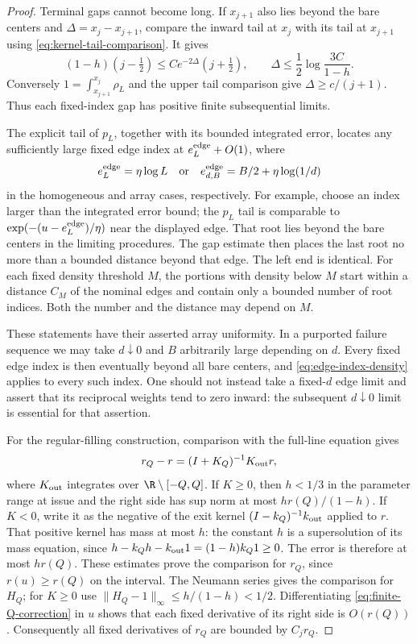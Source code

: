 \begin{proof}
Terminal gaps cannot become long.  If $x_{j+1}$ also lies beyond
the bare centers and $\Delta=x_j-x_{j+1}$, compare the inward
tail at $x_j$ with its tail at $x_{j+1}$ using
\eqref{eq:kernel-tail-comparison}.  It gives
\[
 (1-h)(j-\tfrac12)
 \le C e^{-2\Delta}(j+\tfrac12),
 \qquad
 \Delta\le\frac12\log\frac{3C}{1-h}.
\]
Conversely $1=\int_{x_{j+1}}^{x_j}\rho_L$ and the upper tail
comparison give $\Delta\ge c/(j+1)$.
Thus each fixed-index gap has positive finite subsequential limits.

The explicit tail of $p_L$, together with its bounded integrated
error, locates any sufficiently large fixed edge index at
$e_L^{\rm edge}+O(1)$, where
\begin{equation}\label{eq:nominal-edges}
 e_L^{\rm edge}=\eta\log L
 \quad\hbox{or}\quad
 e_{d,B}^{\rm edge}=B/2+\eta\log(1/d)
\end{equation}
in the homogeneous and array cases, respectively.  For example,
choose an index larger than the integrated error bound; the
$p_L$ tail is comparable to
$\exp(-(u-e_L^{\rm edge})/\eta)$ near the displayed edge.
That root lies beyond the bare centers in the limiting procedures.
The gap estimate then places the last root no more than a bounded
distance beyond that edge.  The left end is identical.
For each fixed density threshold $M$, the portions with density
below $M$ start within a distance $C_M$ of the nominal edges and
contain only a bounded number of root indices.  Both the number and
the distance may depend on $M$.

These statements have their asserted array uniformity.  In a
purported failure sequence we may take $d\downarrow0$ and $B$
arbitrarily large depending on $d$.  Every fixed edge index is then
eventually beyond all bare centers, and
\eqref{eq:edge-index-density} applies to every such index.
One should not instead take a fixed-$d$ edge limit and assert that
its reciprocal weights tend to zero inward: the subsequent
$d\downarrow0$ limit is essential for that assertion.

For the regular-filling construction, comparison with the full-line
equation gives
\begin{equation}\label{eq:finite-Q-correction}
 r_Q-r=(I+K_Q)^{-1}K_{\rm out}r,
\end{equation}
where $K_{\rm out}$ integrates over $\R\setminus[-Q,Q]$.
If $K\ge0$, then $h<1/3$ in the parameter range at issue and the
right side has sup norm at most $h r(Q)/(1-h)$.
If $K<0$, write it as the negative of the exit kernel
$(I-k_Q)^{-1}k_{\rm out}$ applied to $r$.
That positive kernel has mass at most $h$: the constant $h$ is a
supersolution of its mass equation, since
$h-k_Qh-k_{\rm out}1=(1-h)k_Q1\ge0$.
The error is therefore at most $h r(Q)$.
These estimates prove the comparison for $r_Q$, since
$r(u)\ge r(Q)$ on the interval.  The Neumann series gives the
comparison for $H_Q$; for $K\ge0$ use
$\|H_Q-1\|_\infty\le h/(1-h)<1/2$.
Differentiating \eqref{eq:finite-Q-correction} in $u$ shows that
each fixed derivative of its right side is $O(r(Q))$.
Consequently all fixed derivatives of $r_Q$ are bounded by
$C_jr_Q$.


\end{proof}
